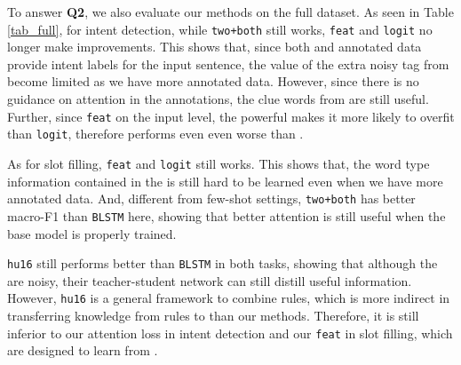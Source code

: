 To answer \textbf{Q2}, we also evaluate our methods on the full dataset.
As seen in Table \ref{tab_full}, for intent detection, while \texttt{two+both} still works, \texttt{feat} and \texttt{logit} no longer make improvements.
This shows that, since both \REtag and annotated data provide intent labels for the input sentence, the value of the extra noisy tag from \RE become limited as we have more annotated data.
However, since there is no guidance on attention in the annotations, the clue words from \RE are still useful.
Further, since \texttt{feat}  on the input level, the powerful \NN makes it more likely to overfit than \texttt{logit}, therefore performs even even worse than \BLSTM.

As for slot filling, \texttt{feat} and \texttt{logit} still works.
This shows that, the word type information contained in the \REtags is still hard to be learned even when we have more annotated data.
And, different from few-shot settings, \texttt{two+both} has better macro-F1 than \texttt{BLSTM} here, showing that better attention is still useful when the base model is properly trained.

\texttt{hu16} still performs better than \texttt{BLSTM} in both tasks, showing that although the \REtags are noisy, their teacher-student network can still distill useful information.
However, \texttt{hu16} is a general framework to combine \FOL rules, which is more indirect in transferring knowledge from rules to \NN than our methods. Therefore, it is still  inferior to our attention loss in intent detection and our \texttt{feat} in slot filling, which are designed to learn from \REs.

